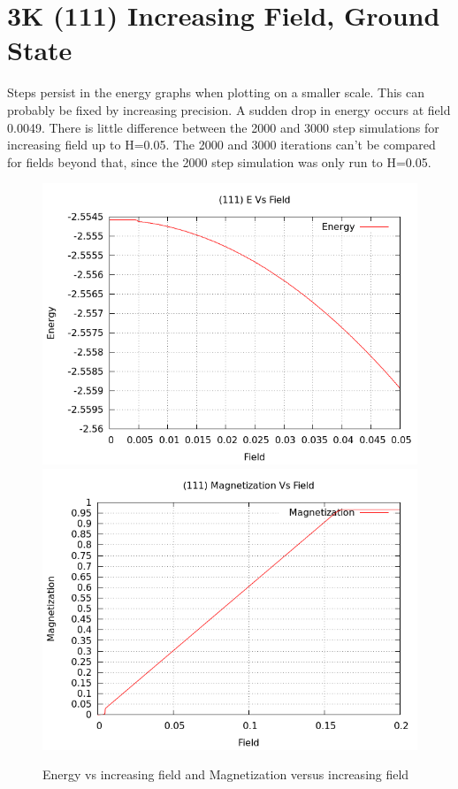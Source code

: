 \documentclass{article}
\begin{document}
\section{3K (111) Increasing Field, Ground State}
Steps persist in the energy graphs when plotting on a smaller scale. This can probably be fixed by increasing precision. 
A sudden drop in energy occurs at field 0.0049. There is little difference between the 2000 and 3000 step simulations for
increasing field up to H=0.05. The 2000 and 3000 iterations can't be compared for fields beyond that, since the 2000
step simulation was only run to H=0.05.
\begin{figure}[h]
 \centering 
\includegraphics[scale=0.45]{HVariedData/Increasing/111EInc.png}
\includegraphics[scale=0.45]{HVariedData/Increasing/111Minc.png}
\caption{Energy vs increasing field and Magnetization versus increasing field}
\end{figure}
\end{document}
